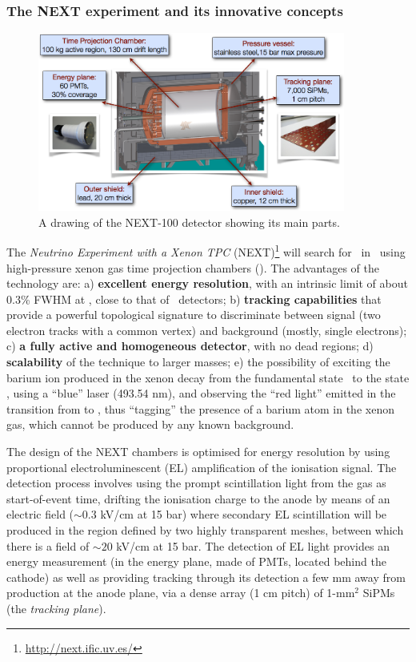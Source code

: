  
\subsubsection*{The NEXT experiment and its innovative concepts}
\begin{figure}
\centering
\includegraphics[width=0.9\textwidth]{img/NEXT.png}
\caption{\small A drawing of the NEXT-100 detector showing its main parts.} \label{fig.NEXT100}
\end{figure}

The \emph{Neutrino Experiment with a Xenon TPC} (NEXT)\footnote{\href{http://next.ific.uv.es/}{http://next.ific.uv.es/}} will search for \bbonu\ in \XE\ using  high-pressure xenon gas  time projection chambers (\HPXE). The advantages of the technology are: 
a) {\bf excellent energy resolution}, with an intrinsic limit of about 0.3\% FWHM at \Qbb, close to that of \GE\ detectors; b)
{\bf tracking capabilities} that provide a powerful topological signature to discriminate between signal (two electron tracks with a common vertex) and background (mostly, single electrons); c)
{\bf a fully active and homogeneous detector}, with no dead regions; d) {\bf scalability} of the technique to larger masses; e) the possibility of exciting the barium ion produced in the xenon decay from the fundamental state \TwoS\ to the state \TwoP, using a ``blue'' laser (493.54 nm), and observing the ``red light'' emitted in the transition from \TwoP to \TwoD, thus ``tagging'' the presence of a barium atom in the xenon gas, which cannot be produced by any known background. 

The design of the NEXT chambers is optimised for energy resolution by using proportional electroluminescent (EL) amplification of the ionisation signal. The detection process involves using the prompt scintillation light from the gas as start-of-event time, drifting the ionisation charge to the anode by means of an electric field ($\sim0.3$ kV/cm at 15 bar) where secondary EL scintillation will be produced in the region defined by two highly transparent meshes, between which there is a field of $\sim20$ kV/cm at 15 bar. The detection of EL light provides an energy measurement (in the energy plane, made of PMTs, located behind the cathode) as well as providing tracking through its detection a few mm away from production at the anode plane, via a dense array (1 cm pitch) of 1-mm$^{2}$ SiPMs (the \emph{tracking plane}).

